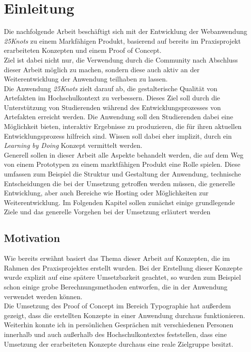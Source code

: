 \chapter{Einleitung}
\thispagestyle{fancy}
Die nachfolgende Arbeit beschäftigt sich mit der Entwicklung der Webanwendung \textit{25Knots} zu einem Markfähigen Produkt, basierend auf bereits im Praxisprojekt erarbeiteten Konzepten und einem Proof of Concept.\\
Ziel ist dabei nicht nur, die Verwendung durch die Community\footnotemark{} nach Abschluss dieser Arbeit möglich zu machen, sondern diese auch aktiv an der Weiterentwicklung der Anwendung teilhaben zu lassen.\\

Die Anwendung \textit{25Knots} zielt darauf ab, die gestalterische Qualität von Artefakten im Hochschulkontext zu verbessern. Dieses Ziel soll durch die Unterstützung von Studierenden während des Entwicklungsprozesses von Artefakten erreicht werden. Die Anwendung soll den Studierenden dabei eine Möglichkeit bieten, interaktiv Ergebnisse zu produzieren, die für ihren aktuellen Entwicklungsprozess hilfreich sind. Wissen soll dabei eher implizit, durch ein \textit{Learning by Doing} Konzept vermittelt werden.\\

Generell sollen in dieser Arbeit alle Aspekte behandelt werden, die auf dem Weg von einem Prototypen zu einem marktfähigen Produkt eine Rolle spielen. Diese umfassen zum Beispiel die Struktur und Gestaltung der Anwendung, technische Entscheidungen die bei der Umsetzung getroffen werden müssen, die generelle Entwicklung, aber auch Bereiche wie Hosting oder Möglichkeiten zur Weiterentwicklung.
Im Folgenden Kapitel sollen zunächst einige grundlegende Ziele und das generelle Vorgehen bei der Umsetzung erläutert werden


\section{Motivation}
Wie bereits erwähnt basiert das Thema dieser Arbeit auf Konzepten, die im Rahmen des Praxisprojektes  erstellt wurden. Bei der Erstellung dieser Konzepte wurde explizit auf eine spätere Umsetzbarkeit geachtet, so wurden zum Beispiel schon einige grobe Berechnungsmethoden entworfen, die in der Anwendung verwendet werden können.\\
Die Umsetzung des Proof of Concept im Bereich Typographie hat außerdem gezeigt, dass die erstellten Konzepte in einer Anwendung durchaus funktionieren.\\
Weiterhin konnte ich in persönlichen Gesprächen mit verschiedenen Personen innerhalb und auch außerhalb des Hochschulkontextes feststellen, dass eine Umsetzung der erarbeiteten Konzepte durchaus eine reale Zielgruppe besitzt.\\


